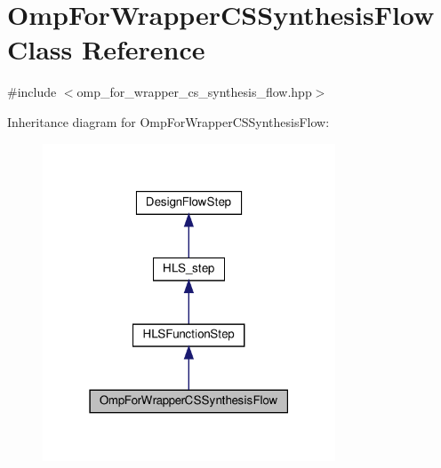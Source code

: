 \hypertarget{classOmpForWrapperCSSynthesisFlow}{}\section{Omp\+For\+Wrapper\+C\+S\+Synthesis\+Flow Class Reference}
\label{classOmpForWrapperCSSynthesisFlow}


{\ttfamily \#include $<$omp\+\_\+for\+\_\+wrapper\+\_\+cs\+\_\+synthesis\+\_\+flow.\+hpp$>$}



Inheritance diagram for Omp\+For\+Wrapper\+C\+S\+Synthesis\+Flow\+:
\nopagebreak
\begin{figure}[H]
\begin{center}
\leavevmode
\includegraphics[width=247pt]{de/db9/classOmpForWrapperCSSynthesisFlow__inherit__graph}
\end{center}
\end{figure}


